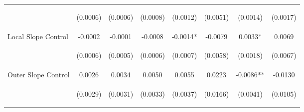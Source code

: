 \begin{tabular}{lccccccc}
\vspace{4pt} & \begin{footnotesize}(0.0006)\end{footnotesize} & \begin{footnotesize}(0.0006)\end{footnotesize} & \begin{footnotesize}(0.0008)\end{footnotesize} & \begin{footnotesize}(0.0012)\end{footnotesize} & \begin{footnotesize}(0.0051)\end{footnotesize} & \begin{footnotesize}(0.0014)\end{footnotesize} & \begin{footnotesize}(0.0017)\end{footnotesize} \\
Local Slope Control & -0.0002 & -0.0001 & -0.0008 & -0.0014* & -0.0079 & 0.0033* & 0.0069 \\
\vspace{4pt} & \begin{footnotesize}(0.0006)\end{footnotesize} & \begin{footnotesize}(0.0005)\end{footnotesize} & \begin{footnotesize}(0.0006)\end{footnotesize} & \begin{footnotesize}(0.0007)\end{footnotesize} & \begin{footnotesize}(0.0058)\end{footnotesize} & \begin{footnotesize}(0.0018)\end{footnotesize} & \begin{footnotesize}(0.0067)\end{footnotesize} \\
Outer Slope Control & 0.0026 & 0.0034 & 0.0050 & 0.0055 & 0.0223 & -0.0086** & -0.0130 \\
 & \begin{footnotesize}(0.0029)\end{footnotesize} & \begin{footnotesize}(0.0031)\end{footnotesize} & \begin{footnotesize}(0.0033)\end{footnotesize} & \begin{footnotesize}(0.0037)\end{footnotesize} & \begin{footnotesize}(0.0166)\end{footnotesize} & \begin{footnotesize}(0.0041)\end{footnotesize} & \begin{footnotesize}(0.0105)\end{footnotesize} \\

\end{tabular}
